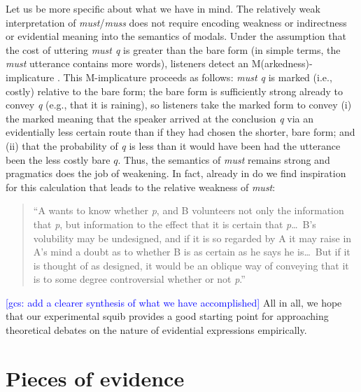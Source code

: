 \documentclass[11pt]{article}
\newcommand{\gcs}[1]{\textcolor{blue}{[gcs: #1]}}
\begin{document}
Let us be more specific about what we have in mind. The relatively weak interpretation of \emph{must}/\emph{muss} does not require encoding weakness or indirectness or evidential meaning into the semantics of modals. Under the assumption that the cost of uttering \emph{must q} is greater than the bare form (in simple terms, the \emph{must} utterance contains more words), listeners detect an M(arkedness)-implicature \citep{levinson2000}. This M-implicature proceeds as follows: \emph{must q} is marked (i.e., costly) relative to the bare form; the bare form is sufficiently strong already to convey \emph{q} (e.g., that it is raining), so listeners take the marked form to convey (i) the marked meaning that the speaker arrived at the conclusion \emph{q} via an evidentially less certain route than if they had chosen the shorter, bare form; and (ii) that the probability of \emph{q} is less than it would have been had the utterance been the less costly bare $q$. Thus, the semantics of \emph{must} remains strong and pragmatics does the job of weakening. In fact, already in \citet[pp.~33--34]{grice1989} do we find inspiration for this calculation that leads to the relative weakness of \emph{must}:

\begin{quotation}
``A wants to know whether \emph{p}, and B volunteers not only the information that \emph{p}, but information to the effect that it is certain that \emph{p}\ldots\ B's volubility may be undesigned, and if it is so regarded by A it may raise in A's mind a doubt as to whether B is as certain as he says he is\ldots\ But if it is thought of as designed, it would be an oblique way of conveying that it is to some degree controversial whether or not \emph{p}.''
\end{quotation}


\gcs{add a clearer synthesis of what we have accomplished} 
All in all, we hope that our experimental squib provides a good starting point for approaching theoretical debates on the nature of evidential expressions empirically.



\appendix

\section{Pieces of evidence}
\label{sec:evidence}
\end{document}
